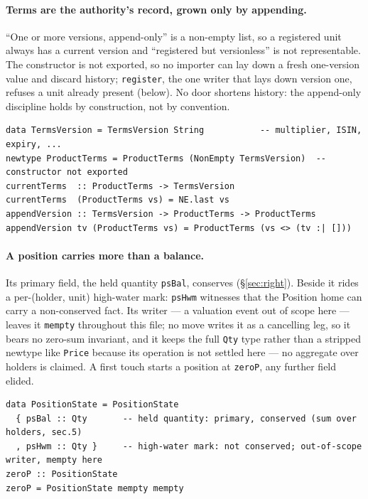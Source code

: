 \documentclass[11pt,a4paper]{article}
\begin{document}
\paragraph{Terms are the authority's record, grown only by appending.}
``One or more
versions, append-only'' is a non-empty list, so a registered unit always has a
current version and ``registered but versionless'' is not representable. The
constructor is not exported, so no importer can lay down a fresh one-version value
and discard history; \texttt{register}, the one writer that lays down version one,
refuses a unit already present (below). No door shortens history: the
append-only discipline holds by construction, not by convention.

\begin{lstlisting}
data TermsVersion = TermsVersion String           -- multiplier, ISIN, expiry, ...
newtype ProductTerms = ProductTerms (NonEmpty TermsVersion)  -- constructor not exported
currentTerms  :: ProductTerms -> TermsVersion
currentTerms  (ProductTerms vs) = NE.last vs
appendVersion :: TermsVersion -> ProductTerms -> ProductTerms
appendVersion tv (ProductTerms vs) = ProductTerms (vs <> (tv :| []))
\end{lstlisting}

\paragraph{A position carries more than a balance.}
Its primary field, the held quantity \texttt{psBal}, conserves (\S\ref{sec:right}).
Beside it rides a per-(holder, unit) high-water mark: \texttt{psHwm} witnesses that the
Position home can carry a non-conserved fact. Its writer --- a valuation event out of
scope here --- leaves it \texttt{mempty} throughout this file; no move writes it as a
cancelling leg, so it bears no zero-sum invariant, and it keeps the full \texttt{Qty}
type rather than a stripped newtype like \texttt{Price} because its operation is not
settled here --- no aggregate over holders is claimed. A first touch starts a position at
\texttt{zeroP}, any further field elided.

\begin{lstlisting}
data PositionState = PositionState
  { psBal :: Qty       -- held quantity: primary, conserved (sum over holders, sec.5)
  , psHwm :: Qty }     -- high-water mark: not conserved; out-of-scope writer, mempty here
zeroP :: PositionState
zeroP = PositionState mempty mempty
\end{lstlisting}
\end{document}
